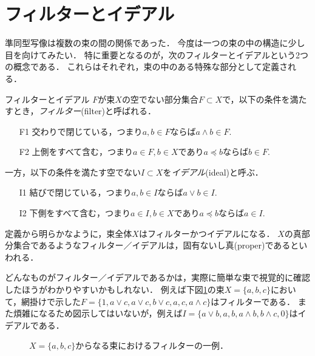 \documentclass[11pt,a4paper]{jsarticle}
\begin{document}
\section{フィルターとイデアル}
準同型写像は複数の束の間の関係であった．
今度は一つの束の中の構造に少し目を向けてみたい．
特に重要となるのが，次のフィルターとイデアルという2つの概念である．
これらはそれぞれ，束の中のある特殊な部分として定義される．
\begin{itembox}[l]{フィルターとイデアル}
$F$が束$X$の空でない部分集合$F \subset X$で，以下の条件を満たすとき，\emph{フィルター}(filter)と呼ばれる．
\begin{enumerate}
    \item[F1] 交わりで閉じている，つまり$a, b \in F$ならば$a \wedge b \in F$.
    \item[F2] 上側をすべて含む，つまり$a \in F, b \in X$であり$a \preceq b$ならば$b \in F$.
\end{enumerate}
一方，以下の条件を満たす空でない$I \subset X$を\emph{イデアル}(ideal)と呼ぶ．
\begin{enumerate}
    \item[I1] 結びで閉じている，つまり$a, b \in I$ならば$a \vee b \in I$.
    \item[I2] 下側をすべて含む，つまり$a \in I, b \in X$であり$a \preceq b$ならば$a \in I$.
\end{enumerate}
\end{itembox}

定義から明らかなように，束全体$X$はフィルターかつイデアルになる．
$X$の真部分集合であるようなフィルター／イデアルは，固有ないし真(proper)であるといわれる．

どんなものがフィルター／イデアルであるかは，実際に簡単な束で視覚的に確認したほうがわかりやすいかもしれない．
例えば下図\ref{fig:3bool}の束$X = \{ a, b, c\}$において，網掛けで示した$F =\{ 1, a\vee c, a\vee c, b\vee c, a, c, a \wedge c\}$はフィルターである．
また煩雑になるため図示してはいないが，例えば$I =\{ a \vee b, a, b, a\wedge b, b \wedge c, 0 \}$はイデアルである．
\begin{figure}[h]
    \centering
    \caption{$X = \{a, b, c\}$からなる束におけるフィルターの一例．}
    \label{fig:3bool} 
\end{figure}
\end{document}
